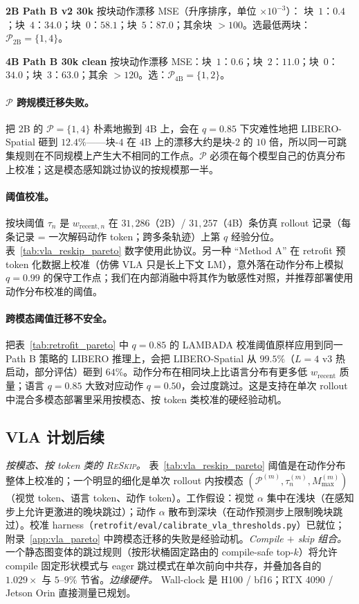 \documentclass{article}
\newcommand{\reskip}{\textsc{ReSkip}}
\begin{document}
\textbf{2B Path B v2 30k} 按块动作漂移 MSE（升序排序，单位 $\times 10^{-3}$）：
块~$1$：$0.4$；块~$4$：$34.0$；块~$0$：$58.1$；块~$5$：$87.0$；其余块 $>$$100$。选最低两块：$\mathcal{P}_{2\text{B}}=\{1, 4\}$。

\textbf{4B Path B 30k clean} 按块动作漂移 MSE：块~$1$：$0.6$；块~$2$：$11.0$；块~$0$：$34.0$；块~$3$：$63.0$；其余 $>$$120$。选：$\mathcal{P}_{4\text{B}}=\{1, 2\}$。

\paragraph{$\mathcal{P}$ 跨规模迁移失败。} 把 $2$B 的 $\mathcal{P}{=}\{1, 4\}$ 朴素地搬到 $4$B 上，会在 $q{=}0.85$ 下灾难性地把 LIBERO-Spatial 砸到 $12.4\%$——块-$4$ 在 $4$B 上的漂移大约是块-$2$ 的 $10$ 倍，所以同一可跳集规则在不同规模上产生大不相同的工作点。$\mathcal{P}$ 必须在每个模型自己的仿真分布上校准；这是模态感知跳过协议的按规模那一半。

\paragraph{阈值校准。} 按块阈值 $\tau_n$ 是 $w_{\text{recent},n}$ 在 $31{,}286$（$2$B）/ $31{,}257$（$4$B）条仿真 rollout 记录（每条记录 = 一次解码动作 token；跨多条轨迹）上第 $q$ 经验分位。表~\ref{tab:vla_reskip_pareto} 数字使用此协议。另一种 ``Method A'' 在 retrofit 预 token 化数据上校准（仿佛 VLA 只是长上下文 LM），意外落在动作分布上模拟 $q{=}0.99$ 的保守工作点；我们在内部消融中将其作为敏感性对照，并推荐部署使用动作分布校准的阈值。

\paragraph{跨模态阈值迁移不安全。} 把表~\ref{tab:retrofit_pareto} 中 $q{=}0.85$ 的 LAMBADA 校准阈值原样应用到同一 Path B 策略的 LIBERO 推理上，会把 LIBERO-Spatial 从 $99.5\%$（$L{=}4$ v3 热启动，部分评估）砸到 $64\%$。动作分布在相同块上比语言分布有更多低 $w_{\text{recent}}$ 质量；语言 $q{=}0.85$ 大致对应动作 $q{=}0.50$，会过度跳过。这是支持在单次 rollout 中混合多模态部署里采用按模态、按 token 类校准的硬经验动机。

\subsection{VLA 计划后续}
\label{app:vla_future}
\emph{按模态、按 token 类的 \reskip{}。} 表~\ref{tab:vla_reskip_pareto} 阈值是在动作分布整体上校准的；一个明显的细化是单次 rollout 内按模态 $(\mathcal{P}^{(m)}, \tau_n^{(m)}, M_{\max}^{(m)})$（视觉 token、语言 token、动作 token）。工作假设：视觉 $\alpha$ 集中在浅块（在感知步上允许更激进的晚块跳过）；动作 $\alpha$ 散布到深块（在动作预测步上限制晚块跳过）。校准 harness（\texttt{retrofit/eval/calibrate\_vla\_thresholds.py}）已就位；附录~\ref{app:vla_pareto} 中跨模态迁移的失败是经验动机。\emph{Compile $+$ skip 组合。} 一个静态图变体的跳过规则（按形状桶固定路由的 compile-safe top-$k$）将允许 compile 固定形状模式与 eager 跳过模式在单次前向中共存，并叠加各自的 $1.029\times$ 与 $5$--$9\%$ 节省。\emph{边缘硬件。} Wall-clock 是 H100 / bf16；RTX 4090 / Jetson Orin 直接测量已规划。
\end{document}
